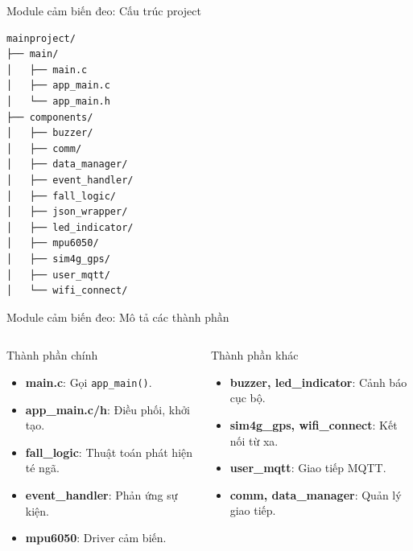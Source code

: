 \begin{frame}[fragile]{Module cảm biến đeo: Cấu trúc project}
    \renewcommand{\baselinestretch}{0.8}
    \begin{verbatim}
mainproject/
├── main/
│   ├── main.c
│   ├── app_main.c
│   └── app_main.h
├── components/
│   ├── buzzer/
│   ├── comm/
│   ├── data_manager/
│   ├── event_handler/
│   ├── fall_logic/
│   ├── json_wrapper/
│   ├── led_indicator/
│   ├── mpu6050/
│   ├── sim4g_gps/
│   ├── user_mqtt/
│   └── wifi_connect/
    \end{verbatim}
    \renewcommand{\baselinestretch}{1.0}
\end{frame}

\begin{frame}{Module cảm biến đeo: Mô tả các thành phần}
    \begin{columns}[t]
        \begin{column}{0.48\textwidth}
            \begin{block}{Thành phần chính}
                \begin{itemize}
                    \item \textbf{main.c}: Gọi \texttt{app\_main()}.
                    \item \textbf{app\_main.c/h}: Điều phối, khởi tạo.
                    \item \textbf{fall\_logic}: Thuật toán phát hiện té ngã.
                    \item \textbf{event\_handler}: Phản ứng sự kiện.
                    \item \textbf{mpu6050}: Driver cảm biến.
                \end{itemize}
            \end{block}
        \end{column}
        \begin{column}{0.48\textwidth}
            \begin{block}{Thành phần khác}
                \begin{itemize}
                    \item \textbf{buzzer, led\_indicator}: Cảnh báo cục bộ.
                    \item \textbf{sim4g\_gps, wifi\_connect}: Kết nối từ xa.
                    \item \textbf{user\_mqtt}: Giao tiếp MQTT.
                    \item \textbf{comm, data\_manager}: Quản lý giao tiếp.
                \end{itemize}
            \end{block}
        \end{column}
    \end{columns}
\end{frame}

